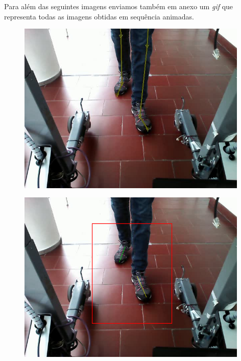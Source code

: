 \documentclass[a4paper]{report}
\begin{document}
Para além das seguintes imagens enviamos também em anexo um \textit{gif} que representa todas as imagens
obtidas em sequência animadas.

\begin{figure}[H]
\centering
\begin{minipage}{.5\textwidth}
  \centering
    \includegraphics[width=0.98\textwidth]{images/building/results/frameGT00.png}
\end{minipage}%
\begin{minipage}{.5\textwidth}
  \centering
    \includegraphics[width=0.98\textwidth]{images/building/results/frame00.png}
    \label{img:Frame00}
\end{minipage}%
\end{figure}
\end{document}

